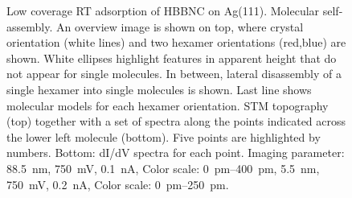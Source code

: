 \begin{figure}[h!]\centering
	 \quad
	\caption{Low coverage RT adsorption of HBBNC on Ag(111).  Molecular self-assembly. An overview image is shown on top, where crystal orientation (white lines) and two hexamer orientations (red,blue) are shown. White ellipses highlight features in apparent height that do not appear for single molecules. In between, lateral disassembly of a single hexamer into single molecules is shown. Last line shows molecular models for each hexamer orientation.  STM topography (top) together with a set of spectra along the points indicated across the lower left molecule (bottom). Five points are highlighted by numbers. Bottom: dI/dV spectra for each point. Imaging parameter:  \SI{88.5}{\nano \meter}, \SI{750}{\milli \volt}, \SI{0.1}{\nano \ampere}, Color scale: \SIrange{0}{400}{\pico \meter},  \SI{5.5}{\nano \meter}, \SI{750}{\milli \volt}, \SI{0.2}{\nano \ampere}, Color scale: \SIrange{0}{250}{\pico \meter}.}
	\label{fig:HBBNC-assembly-spectra}
\end{figure}

